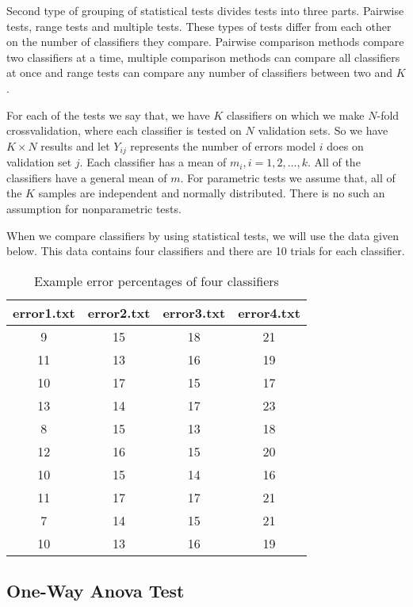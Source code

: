 \documentclass[a4paper,12pt]{book}
\begin{document}
Second type of grouping of statistical tests divides tests into three parts. Pairwise tests, range tests and multiple tests. These types of tests differ from each other on the number of classifiers they compare. Pairwise comparison methods compare two classifiers at a time, multiple comparison methods can compare all classifiers at once and range tests can compare any number of classifiers between two and $K$.

For each of the tests we say that, we have $K$ classifiers on which we make $N$-fold crossvalidation, where each classifier is tested on $N$ validation sets. So we have $K\times N$ results and let $Y_{ij}$ represents the number of errors model $i$ does on validation set $j$. Each classifier has a mean of $m_i, i=1, 2, \ldots, k$. All of the classifiers have a general mean of $m$. For parametric tests we assume that, all of the $K$ samples are independent and normally distributed. There is no such an assumption for nonparametric tests.

When we compare classifiers by using statistical tests, we will use the data given below. This data contains four classifiers and there are 10 trials for each classifier. 

\begin{table}[h!]
\label{example}
\begin{center}
\caption{Example error percentages of four classifiers}
\begin{tabular}{cccc}
\hline
error1.txt & error2.txt & error3.txt & error4.txt \\
\hline
9  & 15 & 18 & 21 \\
11 & 13 & 16 & 19 \\
10 & 17 & 15 & 17 \\
13 & 14 & 17 & 23 \\
8  & 15 & 13 & 18 \\
12 & 16 & 15 & 20 \\
10 & 15 & 14 & 16 \\
11 & 17 & 17 & 21 \\
7  & 14 & 15 & 21 \\
10 & 13 & 16 & 19 \\
\hline
\end{tabular}
\end{center}
\end{table}

\subsection{One-Way Anova Test}
\end{document}

